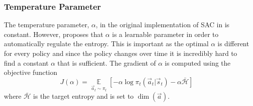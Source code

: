 \subsubsection{Temperature Parameter} The temperature parameter, $\alpha$, in the original implementation of SAC in \cite{haarnoja_soft_2018} is constant. However, \cite{haarnoja_soft_2019} proposes that $\alpha$ is a learnable parameter in order to automatically regulate the entropy. This is important as the optimal $\alpha$ is different for every policy and since the policy changes over time it is incredibly hard to find a constant $\alpha$ that is sufficient. The gradient of $\alpha$ is computed using the objective function
\begin{equation}
    J(\alpha) = \operatorname*{\mathbb{E}}\limits_{\vec a_t \sim \pi_t}
    \left[
        -\alpha \log \pi_t (\vec a_t | \vec s_t) - \alpha \bar{\mathcal{H}}
    \right]
\end{equation}
where $\bar{\mathcal{H}}$ is the target entropy and is set to $\dim(\vec a)$.
